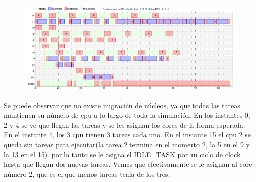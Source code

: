 \begin{figure}[h]
  \includegraphics[width=\textwidth]{../ej8/rr2.png}
  \caption{}
\end{figure}

Se puede observar que no existe migración de núcleos, ya que todas las tareas mantienen su número de cpu a lo largo de toda la simulación.
En los instantes 0, 2 y 4 se ve que llegan las tareas y se les asignan los cores de la forma esperada. En el instante 4, los 3 cpu tienen
3 tareas cada uno. En el instante 15 el cpu 2 se queda sin tareas para ejecutar(la tarea 2 termina en el momento 2, la 5 en el 9 y la 13 en el 15). por lo tanto se le asigna el IDLE_TASK por un ciclo de clock
hasta que llegan dos nuevas tareas. Vemos que efectivamente se le asignan al core número 2, que es el que menos tareas tenia de los tres. 









